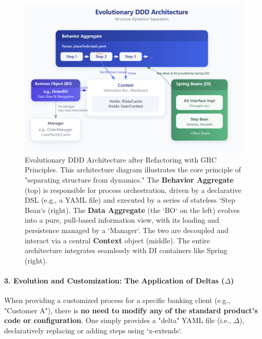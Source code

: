 \documentclass[11pt]{article}
\begin{document}
\begin{figure}[htbp]
    \centering
    \includegraphics[width=\textwidth]{ddd/nop-ddd-arch.png}
    \caption{Evolutionary DDD Architecture after Refactoring with GRC Principles. This architecture diagram illustrates the core principle of "separating structure from dynamics." The \textbf{Behavior Aggregate} (top) is responsible for process orchestration, driven by a declarative DSL (e.g., a YAML file) and executed by a series of stateless `Step Bean`s (right). The \textbf{Data Aggregate} (the `BO` on the left) evolves into a pure, pull-based information view, with its loading and persistence managed by a `Manager`. The two are decoupled and interact via a central \textbf{Context} object (middle). The entire architecture integrates seamlessly with DI containers like Spring (right).}
    \label{fig:nop_ddd_arch}
\end{figure}

\paragraph{3. Evolution and Customization: The Application of Deltas ($\Delta$)}
When providing a customized process for a specific banking client (e.g., "Customer A"), there is \textbf{no need to modify any of the standard product's code or configuration}. One simply provides a "delta" YAML file (i.e., $\Delta$), declaratively replacing or adding steps using `x-extends`.
\end{document}
